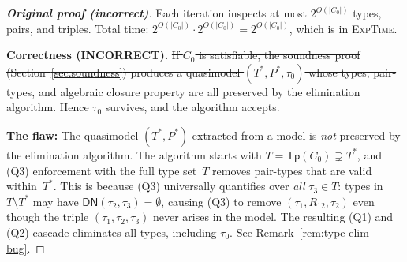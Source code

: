 \documentclass[a4paper,11pt]{article}
\theoremstyle{definition}
\newcommand{\Tp}{\ensuremath{\mathsf{Tp}}}
\newcommand{\EXPTIME}{\textsc{ExpTime}}
\begin{document}
\begin{proof}[\textbf{Original proof (incorrect)}]
Each iteration inspects at most $2^{O(|C_0|)}$ types, pairs, and
triples.  Total time: $2^{O(|C_0|)} \cdot 2^{O(|C_0|)} =
2^{O(|C_0|)}$, which is in \EXPTIME.

\medskip\noindent\textbf{Correctness (INCORRECT).}\;
\sout{If $C_0$ is satisfiable, the soundness proof
(Section~\ref{sec:soundness}) produces a quasimodel $(T^*, P^*,
\tau_0)$ whose types, pair-types, and algebraic closure property are
all preserved by the elimination algorithm.  Hence $\tau_0$ survives,
and the algorithm accepts.}

\medskip\noindent
\textbf{The flaw:} The quasimodel $(T^*, P^*)$ extracted from a
model is \emph{not} preserved by the elimination algorithm.  The
algorithm starts with $T = \Tp(C_0) \supsetneq T^*$, and (Q3)
enforcement with the full type set~$T$ removes pair-types that are
valid within~$T^*$.  This is because (Q3) universally quantifies
over \emph{all} $\tau_3 \in T$: types in $T \setminus T^*$ may have
$\mathsf{DN}(\tau_2, \tau_3) = \emptyset$, causing (Q3) to remove
$(\tau_1, R_{12}, \tau_2)$ even though the triple $(\tau_1, \tau_2,
\tau_3)$ never arises in the model.  The resulting (Q1) and (Q2)
cascade eliminates all types, including $\tau_0$.  See
Remark~\ref{rem:type-elim-bug}.
\end{proof}
\end{document}
